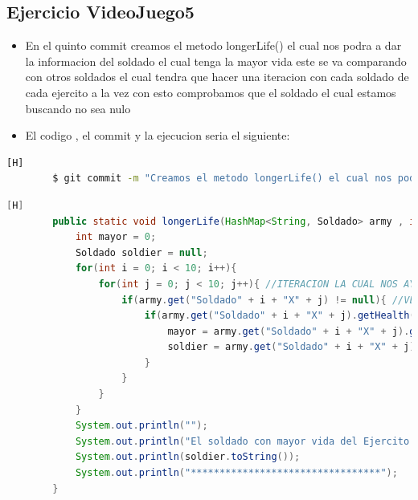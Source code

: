 \documentclass{article}
\begin{document}
	\subsection{Ejercicio VideoJuego5}
	\begin{itemize}	
		\item En el quinto commit creamos el metodo longerLife() el cual nos podra a dar la informacion del soldado el cual tenga la mayor vida este se va comparando con otros soldados el cual tendra que hacer una iteracion con cada soldado de cada ejercito a la vez con esto comprobamos que el soldado el cual estamos buscando no sea nulo
		\item El codigo , el commit y la ejecucion seria el siguiente:
	\end{itemize}	
	\begin{lstlisting}[language=bash,caption={Commit}][H]
		$ git commit -m "Creamos el metodo longerLife() el cual nos podra a dar la informacion del soldado el cual tenga la mayor vida este se va comparando con otros soldados el cual tendra que hacer una iteracion con cada soldado de cada ejercito a la vez con esto comprobamos que el soldado el cual estamos buscando no sea nulo"
	\end{lstlisting}	
	\begin{lstlisting}[language=java,caption={Las lineas de codigos del metodo creado:}][H]
		public static void longerLife(HashMap<String, Soldado> army , int num){
			int mayor = 0;
			Soldado soldier = null;
			for(int i = 0; i < 10; i++){
				for(int j = 0; j < 10; j++){ //ITERACION LA CUAL NOS AYUDA A PASAR POR TODOS LOS SOLDADOS DE CADA EJERCITO
					if(army.get("Soldado" + i + "X" + j) != null){ //VERIFICAMOS QUE EL SOLDADO EL CUAL ESTAMOS VERIFICANOD NO SEA UNO NULO
						if(army.get("Soldado" + i + "X" + j).getHealth() > mayor){
							mayor = army.get("Soldado" + i + "X" + j).getHealth(); //DETECTAMOS EL MAYOR EL CUAL VAMOS COMPRANDO CON LOS DEMAS SOLDADOS PARA TENER SOLO AL SOLDADO EL CUAL TENGA LA MAYOR VIDA
							soldier = army.get("Soldado" + i + "X" + j); //SOLDIER CONTENDRA A ESTE SOLDADO EL CUAL DESPUES SE IMPRIMIRA SUS DATOS PARA VER DE QUE SOLDADO SE TRATA
						}
					}
				}
			}
			System.out.println("");
			System.out.println("El soldado con mayor vida del Ejercito " + num + " es: ");
			System.out.println(soldier.toString());
			System.out.println("*********************************");
		}
	\end{lstlisting}
\end{document}
